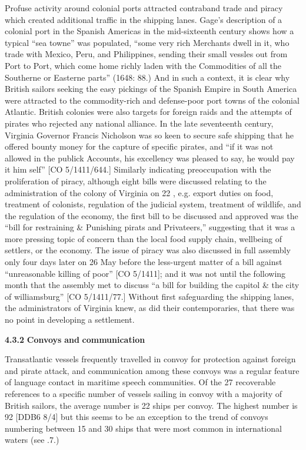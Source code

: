 Profuse activity around colonial ports attracted contraband trade and piracy which created additional traffic in the shipping lanes. Gage’s description of a colonial port in the Spanish Americas in the mid-sixteenth century shows how a typical “sea towne” was populated, “some very rich Merchants dwell in it, who trade with Mexico, Peru, and Philippines, sending their small vessles out from Port to Port, which come home richly laden with the Commodities of all the Southerne or Easterne parts” (1648: 88.) And in such a context, it is clear why British sailors seeking the easy pickings of the Spanish Empire in South America were attracted to the commodity-rich and defense-poor port towns of the colonial Atlantic. British colonies were also targets for foreign raids and the attempts of pirates who rejected any national alliance. In the late seventeenth century, Virginia Governor Francis Nicholson was so keen to secure safe shipping that he offered bounty money for the capture of specific pirates, and “if it was not allowed in the publick Accounts, his excellency was pleased to say, he would pay it him self” [CO 5/1411/644.] Similarly indicating preoccupation with the proliferation of piracy, although eight bills were discussed relating to the administration of the colony of Virginia on 22 \citealt{May1699}, e.g. export duties on food, treatment of colonists, regulation of the judicial system, treatment of wildlife, and the regulation of the economy, the first bill to be discussed and approved was the “bill for restraining \& Punishing pirats and Privateers,” suggesting that it was a more pressing topic of concern than the local food supply chain, wellbeing of settlers, or the economy. The issue of piracy was also discussed in full assembly only four days later on 26 May before the less-urgent matter of a bill against “unreasonable killing of poor” [CO 5/1411]; and it was not until the following month that the assembly met to discuss “a bill for building the capitol \& the city of williamsburg” [CO 5/1411/77.] Without first safeguarding the shipping lanes, the administrators of Virginia knew, as did their contemporaries, that there was no point in developing a settlement. 

 \textbf{4.3.2} \textbf{Convoys} \textbf{and} \textbf{communication}

Transatlantic vessels frequently travelled in convoy for protection against foreign and pirate attack, and communication among these convoys was a regular feature of language contact in maritime speech communities. Of the 27 recoverable references to a specific number of vessels sailing in convoy with a majority of British sailors, the average number is 22 ships per convoy. The highest number is 92 [DDB6 8/4] but this seems to be an exception to the trend of convoys numbering between 15 and 30 ships that were most common in international waters (see .7.) 

